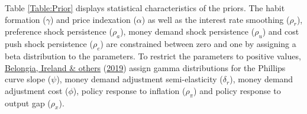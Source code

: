 \documentclass[11pt,preprint, authoryear]{elsarticle}
\numberwithin{equation}{section}
\numberwithin{figure}{section}
\numberwithin{table}{section}
\begin{document}
Table \ref{Table:Prior} displays statistical characteristics of the
priors. The habit formation (\(\gamma\)) and price indexation
(\(\alpha\)) as well as the interest rate smoothing (\(\rho_r\)),
preference shock persistence (\(\rho_a\)), money demand shock
persistence (\(\rho_u\)) and cost push shock persistence (\(\rho_e\))
are constrained between zero and one by assigning a beta distribution to
the parameters. To restrict the parameters to positive values,
\protect\hyperlink{ref-belongia2019reconsideration}{Belongia, Ireland \&
others} (\protect\hyperlink{ref-belongia2019reconsideration}{2019})
assign gamma distributions for the Phillips curve slope (\(\psi\)),
money demand adjustment semi-elasticity (\(\delta_r\)), money demand
adjustment cost (\(\phi\)), policy response to inflation (\(\rho_\pi\))
and policy response to output gap (\(\rho_x\)).
\end{document}
